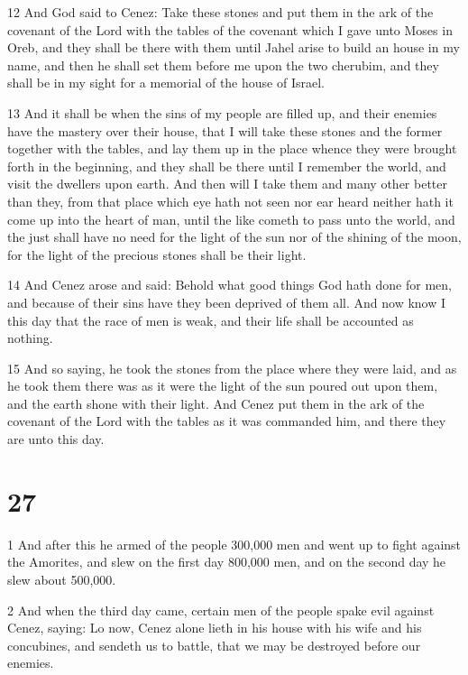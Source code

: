 \par 12 And God said to Cenez: Take these stones and put them in the ark of the covenant of the Lord with the tables of the covenant which I gave unto Moses in Oreb, and they shall be there with them until Jahel arise to build an house in my name, and then he shall set them before me upon the two cherubim, and they shall be in my sight for a memorial of the house of Israel. 

\par 13 And it shall be when the sins of my people are filled up, and their enemies have the mastery over their house, that I will take these stones and the former together with the tables, and lay them up in the place whence they were brought forth in the beginning, and they shall be there until I remember the world, and visit the dwellers upon earth. And then will I take them and many other better than they, from that place which eye hath not seen nor ear heard neither hath it come up into the heart of man, until the like cometh to pass unto the world, and the just shall have no need for the light of the sun nor of the shining of the moon, for the light of the precious stones shall be their light. 

\par 14 And Cenez arose and said: Behold what good things God hath done for men, and because of their sins have they been deprived of them all. And now know I this day that the race of men is weak, and their life shall be accounted as nothing. 

\par 15 And so saying, he took the stones from the place where they were laid, and as he took them there was as it were the light of the sun poured out upon them, and the earth shone with their light. And Cenez put them in the ark of the covenant of the Lord with the tables as it was commanded him, and there they are unto this day. 

\chapter{27}

\par 1 And after this he armed of the people 300,000 men and went up to fight against the Amorites, and slew on the first day 800,000 men, and on the second day he slew about 500,000. 

\par 2 And when the third day came, certain men of the people spake evil against Cenez, saying: Lo now, Cenez alone lieth in his house with his wife and his concubines, and sendeth us to battle, that we may be destroyed before our enemies. 


